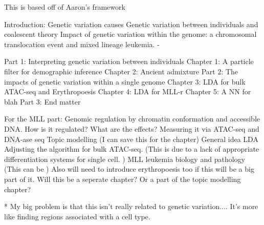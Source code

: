
    This is based off of Aaron's framework
    
    Introduction:
        Genetic variation causes
        Genetic variation between individuals and coalescent theory
        Impact of genetic variation within the genome: a chromosomal translocation event and mixed lineage leukemia.
            - 

    Part 1: Interpreting genetic variation between individuals 
        Chapter 1: A particle filter for demographic inference
        Chapter 2: Ancient admixture 
    Part 2: The impacts of genetic variation within a single genome
        Chapter 3: LDA for bulk ATAC-seq and Erythropoesis
        Chapter 4: LDA for MLL-r 
        Chapter 5: A NN for blah
    Part 3: End matter

    For the MLL part:
        Genomic regulation by chromatin conformation and accessible DNA.
            How is it regulated? What are the effects?
            Measuring it via ATAC-seq and DNA-ase seq
        Topic modelling (I can save this for the chapter)
            General idea
            LDA 
            Adjusting the algorithm for bulk ATAC-seq. (This is due to a lack of appropriate differentiation systems for single cell. )
        MLL leukemia biology and pathology (This can be )
            Also will need to introduce erythropoesis too if this will be a big part of it.
            Will this be a seperate chapter? Or a part of the topic modelling chapter?

        * My big problem is that this isn't really related to genetic variation.... It's more
            like finding regions associated with a cell type. 

